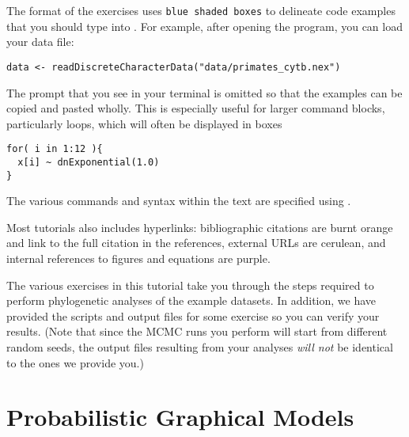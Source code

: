 The format of the exercises uses \colorbox{shadecolor}{\tt blue shaded boxes} to delineate code examples that you should type into \RevBayes. 
For example, after opening the \RevBayes program, you can load your data file:
{\tt \begin{snugshade*}
\begin{lstlisting}
data <- readDiscreteCharacterData("data/primates_cytb.nex")
\end{lstlisting}
\end{snugshade*}}

The  prompt that you see in your terminal is omitted so that the examples can be copied and pasted wholly. 
This is especially useful for larger command blocks, particularly loops, which will often be displayed in boxes
{\tt \begin{snugshade*}
\begin{lstlisting}
for( i in 1:12 ){
  x[i] ~ dnExponential(1.0)
}
\end{lstlisting}
\end{snugshade*}}

The various \RevBayes commands and syntax within the text are specified using . 

Most tutorials also includes hyperlinks: bibliographic citations are {\textcolor{citescol}{burnt orange}} and link to the full citation in the references, external URLs are {\textcolor{urlscol}{cerulean}}, and internal references to figures and equations are {\textcolor{linkscol}{purple}}.

The various exercises in this tutorial take you through the steps required to perform phylogenetic analyses of the example datasets. 
In addition, we have provided the \Rev scripts and output files for some exercise so you can verify your results. (Note that since the MCMC runs you perform will start from different random seeds, the output files resulting from your analyses \textit{will not} be identical to the ones we provide you.)


\bigskip
\section{Probabilistic Graphical Models}

